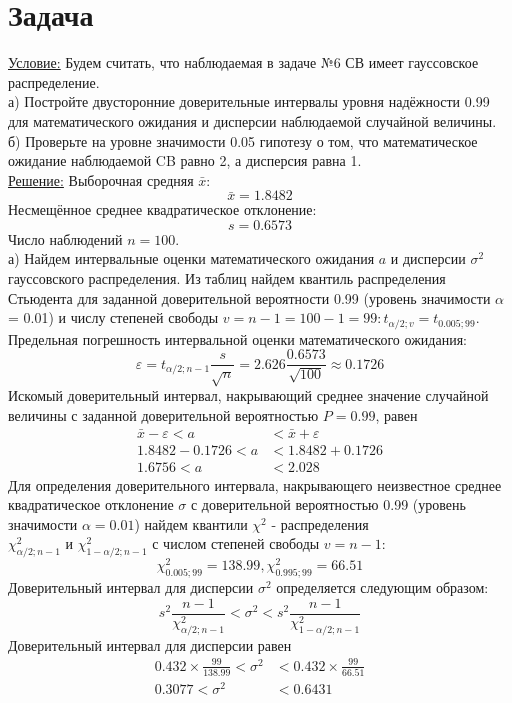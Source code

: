 \documentclass[a4paper,12pt]{article} %
\begin{document}
\section{Задача}
\underline{Условие:} Будем считать, что наблюдаемая в задаче №6 СВ имеет гауссовское
распределение.\\
а) Постройте двусторонние доверительные интервалы уровня надёжности 0.99
для математического ожидания и дисперсии наблюдаемой случайной величины.\\
б) Проверьте на уровне значимости 0.05 гипотезу о том, что математическое
ожидание наблюдаемой CB равно 2, а дисперсия равна 1.\\
\newline
\underline{Решение:} Выборочная средняя \(\bar{x}:\)
\[
  \bar{x} = 1.8482
\]
Несмещённое среднее квадратическое отклонение:
\[
  s = 0.6573
\]
Число наблюдений \(n = 100\).\\
а) Найдем интервальные оценки математического ожидания \(a\) и дисперсии \(\sigma^2\)
гауссовского распределения. Из таблиц найдем квантиль распределения Стьюдента
для заданной доверительной вероятности 0.99 (уровень значимости \(\alpha\) = 0.01) и числу
степеней свободы \(v = n - 1 = 100 - 1 = 99: t_{\alpha/2;v} = t_{0.005;99}\). Предельная погрешность
интервальной оценки математического ожидания:
\[
  \varepsilon = t_{\alpha/2;n-1} \frac{s}{\sqrt{n}} = 2.626\frac{0.6573}{\sqrt{100}} \approx 0.1726
\]
Искомый доверительный интервал, накрывающий среднее значение случайной
величины с заданной доверительной вероятностью \(P=0.99\), равен
\begin{align}
  \bar{x} - \varepsilon < a& < \bar{x} + \varepsilon\\
  1.8482 - 0.1726 < a& < 1.8482 + 0.1726\\
  1.6756 < a& < 2.028
\end{align}
Для определения доверительного интервала, накрывающего неизвестное среднее
квадратическое отклонение \(\sigma\) с доверительной вероятностью 0.99 (уровень
значимости \(\alpha = 0.01\)) найдем квантили \(\chi^2\) - распределения \(\chi^2_{\alpha/2;n-1} \text{ и } \chi^2_{1-\alpha/2;n-1}\) с числом
степеней свободы \(v = n - 1\):
\[
  \chi^2_{0.005;99} = 138.99, \chi^2_{0.995;99} = 66.51
\]
Доверительный интервал для дисперсии \(\sigma^2\) определяется следующим образом:
\[
  s^2\frac{n-1}{\chi^2_{\alpha/2;n-1}} < \sigma^2 < s^2\frac{n - 1}{\chi^2_{1-\alpha/2;n-1}}
\]
Доверительный интервал для дисперсии равен
\begin{align}
  0.432\times \frac{99}{138.99} < \sigma^2& < 0.432\times \frac{99}{66.51}\\
  0.3077< \sigma^2  & < 0.6431
\end{align}
\end{document}
